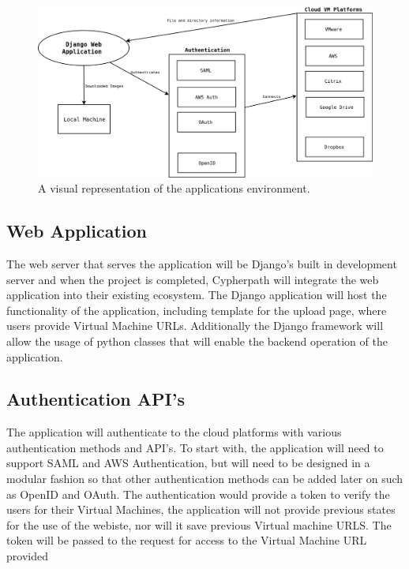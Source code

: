 \documentclass{article}
\begin{document}
    \begin{figure}[h]
    \includegraphics[scale=.4]{downloader_env}
        \caption{A visual representation of the applications environment.}
    \end{figure}


        \subsection{Web Application}
        The web server that serves the application will be Django's built in development server and when the project is completed, Cypherpath will integrate
        the web application into their existing ecosystem. The Django application will host the functionality of the application, including template for the 
        upload page, where users provide Virtual Machine URLs. Additionally the Django framework will allow the usage of python classes that will enable the 
        backend operation of the application.

        
        \subsection{Authentication API's}
        The application will authenticate to the cloud platforms with various authentication methods and API's. To start with, the application will need to support
        SAML and AWS Authentication, but will need to be designed in a modular fashion so that other authentication methods can be added later on such as OpenID and OAuth.
        The authentication would provide a token to verify the users for their Virtual Machines, the application will not provide previous states for the use of the 
        webiste, nor will it save previous Virtual machine URLS. The token will be passed to the request for access to the Virtual Machine URL provided
\end{document}
